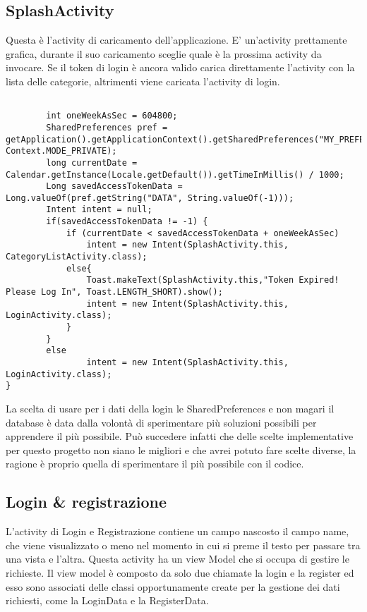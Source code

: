 \documentclass[11pt]{article}
\begin{document}
    \subsection{SplashActivity}
    Questa è l'activity di caricamento dell'applicazione. E' un'activity prettamente grafica, durante il suo caricamento sceglie quale è la prossima activity
    da invocare. Se il token di login è ancora valido carica direttamente l'activity con la lista delle categorie, altrimenti viene caricata l'activity di login.
    \begin{lstlisting}
    
        int oneWeekAsSec = 604800;
        SharedPreferences pref = getApplication().getApplicationContext().getSharedPreferences("MY_PREFERENCES", Context.MODE_PRIVATE);
        long currentDate = Calendar.getInstance(Locale.getDefault()).getTimeInMillis() / 1000;
        Long savedAccessTokenData = Long.valueOf(pref.getString("DATA", String.valueOf(-1)));
        Intent intent = null;
        if(savedAccessTokenData != -1) {
            if (currentDate < savedAccessTokenData + oneWeekAsSec)
                intent = new Intent(SplashActivity.this, CategoryListActivity.class);
            else{
                Toast.makeText(SplashActivity.this,"Token Expired! Please Log In", Toast.LENGTH_SHORT).show();
                intent = new Intent(SplashActivity.this, LoginActivity.class);
            }
        }
        else
                intent = new Intent(SplashActivity.this, LoginActivity.class);
}
    \end{lstlisting}
    
    La scelta di usare per i dati della login le SharedPreferences e non magari il database è data dalla volontà di sperimentare più soluzioni possibili
    per apprendere il più possibile. Può succedere infatti che delle scelte implementative per questo progetto non siano le migliori e che avrei potuto fare
    scelte diverse, la ragione è proprio quella di sperimentare il più possibile con il codice.
    \subsection{Login \& registrazione }
    L'activity di Login e Registrazione contiene un campo nascosto il campo name, che viene visualizzato o meno nel momento in cui si preme il testo per 
    passare tra una vista e l'altra. Questa activity ha un view Model che si occupa di gestire le richieste. Il view model è composto da solo due chiamate
    la login e la register ed esso sono associati delle classi opportunamente create per la gestione dei dati richiesti, come la LoginData e la RegisterData.
\end{document}
